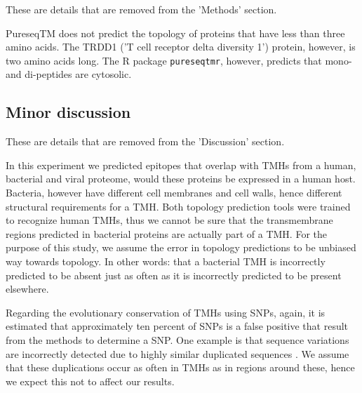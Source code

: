 These are details that are removed from the 'Methods' section.

PureseqTM does not predict the topology
of proteins that have less than three amino acids. 
The TRDD1 ('T cell receptor delta diversity 1') protein,
however, is two amino acids long. 
The R package \verb;pureseqtmr;, however, 
predicts that mono- and di-peptides are cytosolic. 

\subsection{Minor discussion}

These are details that are removed from the 'Discussion' section.


In this experiment we predicted epitopes that overlap with 
TMHs from a human, bacterial and viral proteome,
would these proteins be expressed in a human host.
Bacteria, however have different cell membranes and cell walls, 
hence different structural requirements for a TMH.
Both topology prediction tools were trained to recognize
human TMHs, thus we cannot be sure that
the transmembrane regions predicted in bacterial proteins
are actually part of a TMH.
For the purpose of this study, we assume the 
error in topology predictions to be unbiased way towards topology.
In other words: that a bacterial TMH is incorrectly
predicted to be absent just as often as it is incorrectly
predicted to be present elsewhere.


Regarding the evolutionary conservation of TMHs using SNPs,
again, it is estimated that approximately ten percent
of SNPs is a false positive that result from the methods to determine
a SNP. One example is that sequence variations are incorrectly
detected due to highly similar duplicated sequences \cite{musumeci2010single}.
We assume that these duplications occur as often in TMHs as in
regions around these, hence we expect this not to affect our results.

